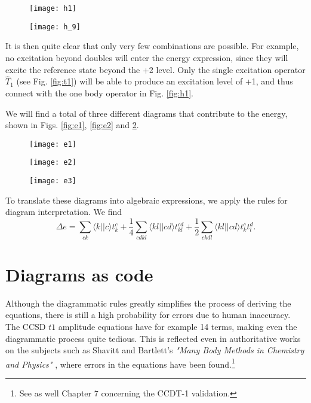 \begin{figure}[!h9h1]
  \centering
  \texttt{[image: h1]}
  \caption{}\label{fig:h1}
\endminipage\hfill
{}
  \centering
  \texttt{[image: h\_9]}
  \caption{}\label{fig:h_9}
\endminipage\hfill
\end{figure}

It is then quite clear that only very few combinations are possible.  For example, no excitation beyond doubles will enter the energy expression, since they will excite the reference state beyond the +2 level. Only the single excitation operator $\hat{T}_1$ (see Fig. \ref{fig:t1}) will be able to produce an excitation level of +1, and thus connect with the one body operator in Fig. \ref{fig:h1}. 

We will find a total of three different diagrams that contribute to the energy, shown in Figs. \ref{fig:e1}, \ref{fig:e2} and \ref{fig:e3}.

\begin{figure}[!ccenergy]
  \centering
  \texttt{[image: e1]}
  \caption{}\label{fig:e1}
\endminipage\hfill
{}
  \centering
  \texttt{[image: e2]}
  \caption{}\label{fig:e2}
\endminipage\hfill
{}
  \centering
  \texttt{[image: e3]}
  \caption{}\label{fig:e3}
\endminipage\hfill
\end{figure}
 
To translate these diagrams into algebraic expressions, we apply the rules for diagram interpretation. We find 
\begin{equation}
\Delta e =  \sum_{ck} \langle k || c \rangle t_{k}^{c}+\frac{1}{4} \sum_{cdkl} \langle kl || cd \rangle t_{kl}^{cd}+\frac{1}{2} \sum_{ckdl} \langle kl || cd \rangle t_{k}^{c} t_{l}^{d}.
\label{eqn:c_energy}
\end{equation}

\section{Diagrams as code}

Although the diagrammatic rules greatly simplifies the process of
deriving the equations, there is still a high probability for errors
due to human inaccuracy. The CCSD $t1$ amplitude equations have for example 14
terms, making even the diagrammatic process quite tedious. This is
reflected even in authoritative works on the subjects such as Shavitt
and Bartlett's \emph{"Many Body Methods in Chemistry and Physics"}
\cite{ShavittBartlett2009}, where errors in the equations have been
found.\footnote{See as well Chapter 7 concerning the CCDT-1 validation.}

